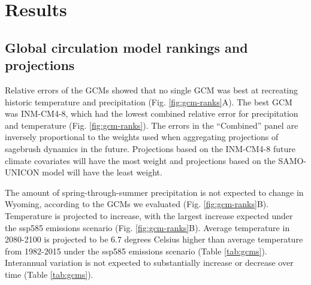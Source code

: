 \documentclass[
  12pt,
]{article}
\begin{document}
\hypertarget{results}{%
\section{Results}\label{results}}

\hypertarget{global-circulation-model-rankings-and-projections}{%
\subsection{Global circulation model rankings and projections}\label{global-circulation-model-rankings-and-projections}}

Relative errors of the GCMs showed that no single GCM was best at recreating historic temperature and precipitation (Fig. \ref{fig:gcm-ranks}A).
The best GCM was INM-CM4-8, which had the lowest combined relative error for precipitation and temperature (Fig. \ref{fig:gcm-ranks}).
The errors in the ``Combined'' panel are inversely proportional to the weights used when aggregating projections of sagebrush dynamics in the future.
Projections based on the INM-CM4-8 future climate covariates will have the most weight and projections based on the SAMO-UNICON model will have the least weight.

The amount of spring-through-summer precipitation is not expected to change in Wyoming, according to the GCMs we evaluated (Fig. \ref{fig:gcm-ranks}B).
Temperature is projected to increase, with the largest increase expected under the ssp585 emissions scenario (Fig. \ref{fig:gcm-ranks}B).
Average temperature in 2080-2100 is projected to be 6.7 degrees Celsius higher than average temperature from 1982-2015 under the ssp585 emissions scenario (Table \ref{tab:gcms}).
Interannual variation is not expected to substantially increase or decrease over time (Table \ref{tab:gcms}).
\end{document}
